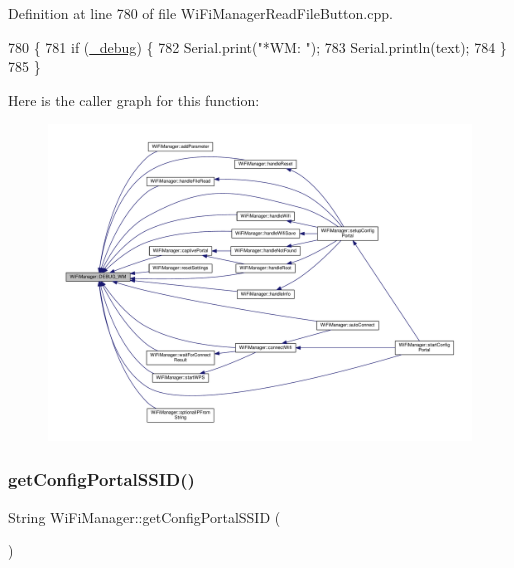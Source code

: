 Definition at line 780 of file Wi\+Fi\+Manager\+Read\+File\+Button.\+cpp.


\begin{DoxyCode}
780                                        \{
781   \textcolor{keywordflow}{if} (\hyperlink{class_wi_fi_manager_ac0f345f4a4c8bc38a49c8f87931b8cd4}{\_debug}) \{
782     Serial.print(\textcolor{stringliteral}{"*WM: "});
783     Serial.println(text);
784   \}
785 \}
\end{DoxyCode}
Here is the caller graph for this function\+:\nopagebreak
\begin{figure}[H]
\begin{center}
\leavevmode
\includegraphics[width=350pt]{d4/dc8/class_wi_fi_manager_ae5f595c670ccbcf9a191baf50f5c7c26_icgraph}
\end{center}
\end{figure}
\mbox{\label{class_wi_fi_manager_a157dc79b810f8f8d338a6120b13f5c94}} 
\subsubsection{\texorpdfstring{get\+Config\+Portal\+S\+S\+I\+D()}{getConfigPortalSSID()}}
{\footnotesize\ttfamily String Wi\+Fi\+Manager\+::get\+Config\+Portal\+S\+S\+ID (\begin{DoxyParamCaption}{ }\end{DoxyParamCaption})}



